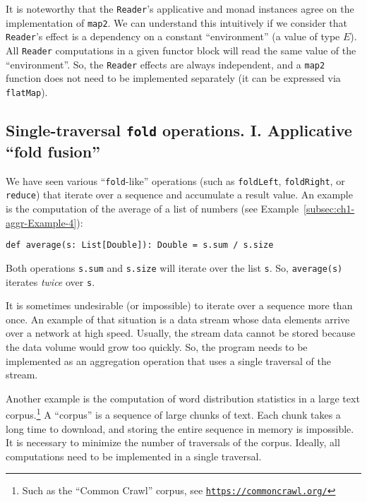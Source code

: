 It is noteworthy that the \lstinline!Reader!\textsf{'}s applicative and monad
instances agree on the implementation of \lstinline!map2!. We can
understand this intuitively if we consider that \lstinline!Reader!\textsf{'}s
effect is a dependency on a constant \textsf{``}environment\textsf{''} (a value of
type $E$). All \lstinline!Reader! computations in a given functor
block will read the same value of the \textsf{``}environment\textsf{''}. So, the \lstinline!Reader!
effects are always independent, and a \lstinline!map2! function does
not need to be implemented separately (it can be expressed via \lstinline!flatMap!).

\subsection{Single-traversal \texttt{fold} operations. I. Applicative \textquotedblleft fold
fusion\textquotedblright\label{subsec:Single-traversal-fold-operations-applicative-fold-fusion}}

We have seen various \textsf{``}\lstinline!fold!-like\textsf{''} operations (such
as \lstinline!foldLeft!, \lstinline!foldRight!, or \lstinline!reduce!)
that iterate over a sequence and accumulate a result value. An example
is the computation of the average of a list of numbers (see Example~\ref{subsec:ch1-aggr-Example-4}):
\begin{lstlisting}
def average(s: List[Double]): Double = s.sum / s.size
\end{lstlisting}
Both operations \lstinline!s.sum! and \lstinline!s.size! will iterate
over the list \lstinline!s!. So, \lstinline!average(s)! iterates
\emph{twice} over \lstinline!s!.

It is sometimes undesirable (or impossible) to iterate over a sequence
more than once. An example of that situation is a data stream whose
data elements arrive over a network at high speed. Usually, the stream
data cannot be stored because the data volume would grow too quickly.
So, the program needs to be implemented as an aggregation
operation that uses a single traversal of the stream. 

Another example is the computation of word distribution statistics
in a large text corpus.\footnote{Such as the \textsf{``}Common Crawl\textsf{''} corpus, see \texttt{\href{https://commoncrawl.org/}{https://commoncrawl.org/}}}
A \textsf{``}corpus\textsf{''} is a sequence of large chunks of text. Each chunk takes
a long time to download, and storing the entire sequence in memory
is impossible. It is necessary to minimize the number of traversals
of the corpus. Ideally, all computations need to be implemented in
a single traversal.

